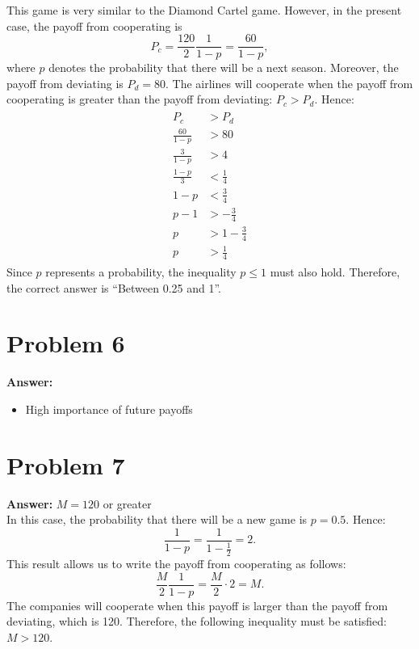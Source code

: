 \documentclass[11pt]{article}
\begin{document}
This game is very similar to the Diamond Cartel game. However, in the present
case, the payoff from cooperating is
\begin{equation}
P_c=\frac{120}{2}\frac{1}{1-p}=\frac{60}{1-p},
\end{equation}
where \(p\) denotes the probability that there will be a next season.
Moreover, the payoff from deviating is \(P_d=80\). The airlines will cooperate
when the payoff from cooperating is greater than the payoff from deviating:
\(P_c>P_d\). Hence:
\begin{align}
  \begin{split}
    P_c&>P_d\\
    \frac{60}{1-p}&>80\\
    \frac{3}{1-p}&>4\\
    \frac{1-p}{3}&<\frac{1}{4}\\
    1-p&<\frac{3}{4}\\
    p-1&>-\frac{3}{4}\\
    p&>1-\frac{3}{4}\\
    p&>\frac{1}{4}
  \end{split}
\end{align}
Since \(p\) represents a probability, the inequality \(p\leq 1\) must also
hold. Therefore, the correct answer is ``Between 0.25 and 1''.
\section*{Problem 6}
\label{sec:org6ba20f1}

\textbf{Answer:}
\begin{itemize}
\item High importance of future payoffs
\end{itemize}
\section*{Problem 7}
\label{sec:org68b879b}

\textbf{Answer:} \(M=120\) or greater\\

In this case, the probability that there will be a new game is \(p=0.5\).
Hence:
\begin{equation}
\frac{1}{1-p}=\frac{1}{1-\frac{1}{2}}=2.
\end{equation}
This result allows us to write the payoff from cooperating as follows:
\begin{equation}
\frac{M}{2}\frac{1}{1-p}=\frac{M}{2}\cdot 2=M.
\end{equation}
The companies will cooperate when this payoff is larger than the payoff from
deviating, which is 120. Therefore, the following inequality must be satisfied:
\(M>120\).
\end{document}
